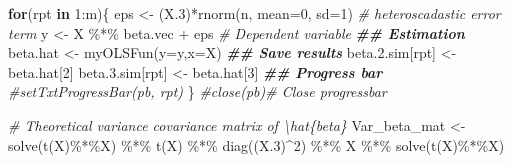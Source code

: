 \documentclass[
]{book}
\newenvironment{Shaded}{\begin{snugshade}}{\end{snugshade}}
\newcommand{\AttributeTok}[1]{\textcolor[rgb]{0.77,0.63,0.00}{#1}}
\newcommand{\CommentTok}[1]{\textcolor[rgb]{0.56,0.35,0.01}{\textit{#1}}}
\newcommand{\ControlFlowTok}[1]{\textcolor[rgb]{0.13,0.29,0.53}{\textbf{#1}}}
\newcommand{\DecValTok}[1]{\textcolor[rgb]{0.00,0.00,0.81}{#1}}
\newcommand{\DocumentationTok}[1]{\textcolor[rgb]{0.56,0.35,0.01}{\textbf{\textit{#1}}}}
\newcommand{\FloatTok}[1]{\textcolor[rgb]{0.00,0.00,0.81}{#1}}
\newcommand{\FunctionTok}[1]{\textcolor[rgb]{0.00,0.00,0.00}{#1}}
\newcommand{\NormalTok}[1]{#1}
\newcommand{\OtherTok}[1]{\textcolor[rgb]{0.56,0.35,0.01}{#1}}
\newcommand{\SpecialCharTok}[1]{\textcolor[rgb]{0.00,0.00,0.00}{#1}}
\begin{document}
\begin{Shaded}
\begin{Highlighting}[]
\ControlFlowTok{for}\NormalTok{(rpt }\ControlFlowTok{in} \DecValTok{1}\SpecialCharTok{:}\NormalTok{m)\{}
\NormalTok{  eps }\OtherTok{\textless{}{-}}\NormalTok{ (X}\FloatTok{.3}\NormalTok{)}\SpecialCharTok{*}\FunctionTok{rnorm}\NormalTok{(n, }\AttributeTok{mean=}\DecValTok{0}\NormalTok{, }\AttributeTok{sd=}\DecValTok{1}\NormalTok{) }\CommentTok{\# heteroscadastic error term}
\NormalTok{  y   }\OtherTok{\textless{}{-}}\NormalTok{ X }\SpecialCharTok{\%*\%}\NormalTok{ beta.vec }\SpecialCharTok{+}\NormalTok{ eps         }\CommentTok{\# Dependent variable}
  \DocumentationTok{\#\# Estimation}
\NormalTok{  beta.hat }\OtherTok{\textless{}{-}} \FunctionTok{myOLSFun}\NormalTok{(}\AttributeTok{y=}\NormalTok{y,}\AttributeTok{x=}\NormalTok{X)}
  \DocumentationTok{\#\# Save results}
\NormalTok{  beta.}\FloatTok{2.}\NormalTok{sim[rpt] }\OtherTok{\textless{}{-}}\NormalTok{ beta.hat[}\DecValTok{2}\NormalTok{]}
\NormalTok{  beta.}\FloatTok{3.}\NormalTok{sim[rpt] }\OtherTok{\textless{}{-}}\NormalTok{ beta.hat[}\DecValTok{3}\NormalTok{]}
  \DocumentationTok{\#\# Progress bar}
  \CommentTok{\#setTxtProgressBar(pb, rpt)}
\NormalTok{\}}
\CommentTok{\#close(pb)\# Close progressbar}


\CommentTok{\# Theoretical variance covariance matrix of \textbackslash{}hat\{beta\}}
\NormalTok{Var\_beta\_mat }\OtherTok{\textless{}{-}} \FunctionTok{solve}\NormalTok{(}\FunctionTok{t}\NormalTok{(X)}\SpecialCharTok{\%*\%}\NormalTok{X) }\SpecialCharTok{\%*\%} \FunctionTok{t}\NormalTok{(X) }\SpecialCharTok{\%*\%} \FunctionTok{diag}\NormalTok{((X}\FloatTok{.3}\NormalTok{)}\SpecialCharTok{\^{}}\DecValTok{2}\NormalTok{) }\SpecialCharTok{\%*\%}\NormalTok{ X }\SpecialCharTok{\%*\%} \FunctionTok{solve}\NormalTok{(}\FunctionTok{t}\NormalTok{(X)}\SpecialCharTok{\%*\%}\NormalTok{X)}


\end{Highlighting}
\end{Shaded}
\end{document}
